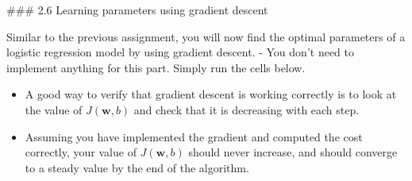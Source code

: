 \documentclass[11pt]{article}
\begin{document}
    \#\#\# 2.6 Learning parameters using gradient descent

Similar to the previous assignment, you will now find the optimal
parameters of a logistic regression model by using gradient descent. -
You don't need to implement anything for this part. Simply run the cells
below.

\begin{itemize}
\item
  A good way to verify that gradient descent is working correctly is to
  look at the value of \(J(\mathbf{w},b)\) and check that it is
  decreasing with each step.
\item
  Assuming you have implemented the gradient and computed the cost
  correctly, your value of \(J(\mathbf{w},b)\) should never increase,
  and should converge to a steady value by the end of the algorithm.
\end{itemize}
\end{document}
